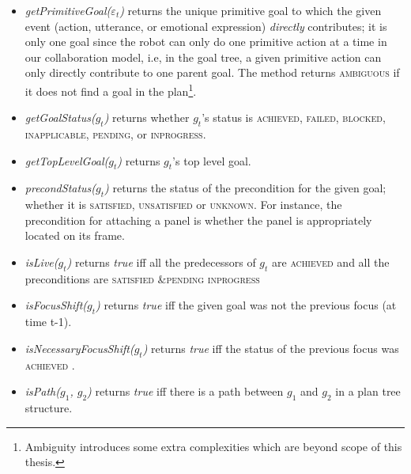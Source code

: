 \documentclass[12pt]{report}
\newcommand\myeq{\stackrel{\mathclap{\normalfont\mbox{def}}}{=}}
\begin{document}
\begin{itemize}
  \setlength\itemsep{1mm}
  \item \textit{getPrimitiveGoal($\varepsilon_t$)} returns the unique primitive
  goal to which the given event (action, utterance, or emotional expression)
  \textit{directly} contributes; it is only one goal since the robot can only do
  one primitive action at a time in our collaboration model, i.e, in the goal
  tree, a given primitive action can only directly contribute to one parent
  goal. The method returns \textsc{ambiguous} if it does not find a goal in
  the plan\footnote{Ambiguity introduces some extra complexities which are
  beyond scope of this thesis.}.
  
  \item \textit{getGoalStatus($g_t$)} returns whether $g_t$'s status is
  \textsc{achieved, failed, blocked, inapplicable, pending,} or
  \textsc{inprogress}.
  
  \item \textit{getTopLevelGoal($g_t$)} returns $g_t$'s top level goal.

  \item \textit{precondStatus($g_t$)} returns the status of the precondition for
  the given goal; whether it is \textsc{satisfied, unsatisfied} or
  \textsc{unknown}. For instance, the precondition for attaching a panel is
  whether the panel is appropriately located on its frame.
  
  \item \textit{isLive($g_t$)} returns \textit{true} iff all the predecessors of
  $g_t$ are \textsc{achieved} and all the preconditions are {\textsc{satisfied}
  &\myeq \textsc{pending} \bigvee \textsc{inprogress}}
  
  \item \textit{isFocusShift($g_t$)} returns \textit{true} iff the given
  goal was not the previous focus (at time t-1).
  
  \item \textit{isNecessaryFocusShift($g_t$)} returns \textit{true} iff the
  status of the previous focus was \textsc{achieved}
  \cite{rich:focused-unfocused-users}.
  
  \item \textit{isPath($g_1$, $g_2$)} returns \textit{true} iff there is a path
  between $g_1$ and $g_2$ in a plan tree structure.
  
  

\end{itemize}
\end{document}
